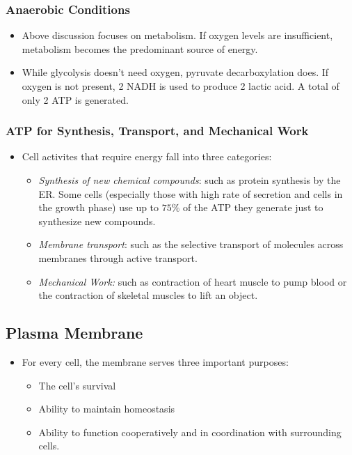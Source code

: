 \documentclass{article}
\numberwithin{equation}{section}
\begin{document}
\subsubsection{Anaerobic Conditions}
\begin{itemize}
    \item Above discussion focuses on  metabolism. If oxygen levels are insufficient,  metabolism becomes the predominant source of energy.
    \item While glycolysis doesn't need oxygen, pyruvate decarboxylation does. If oxygen is not present, 2 NADH is used to produce 2 lactic acid. A total of only 2 ATP is generated. 
\end{itemize}
\subsubsection{ATP for Synthesis, Transport, and Mechanical Work}
\begin{itemize}
    \item Cell activites that require energy fall into three categories:
    \begin{itemize}
        \item \textit{Synthesis of new chemical compounds}: such as protein synthesis by the ER. Some cells (especially those with high rate of secretion and cells in the growth phase) use up to $75\%$ of the ATP they generate just to synthesize new compounds.
        \item \textit{Membrane transport}: such as the selective transport of molecules across membranes through active transport.
        \item \textit{Mechanical Work:} such as contraction of heart muscle to pump blood or the contraction of skeletal muscles to lift an object. 
    \end{itemize}
\end{itemize}
\subsection{Plasma Membrane}
\begin{itemize}
    \item For every cell, the membrane serves three important purposes:
    \begin{itemize}
        \item The cell's survival
        \item Ability to maintain homeostasis
        \item Ability to function cooperatively and in coordination with surrounding cells.
    \end{itemize}
\end{itemize}
\end{document}
